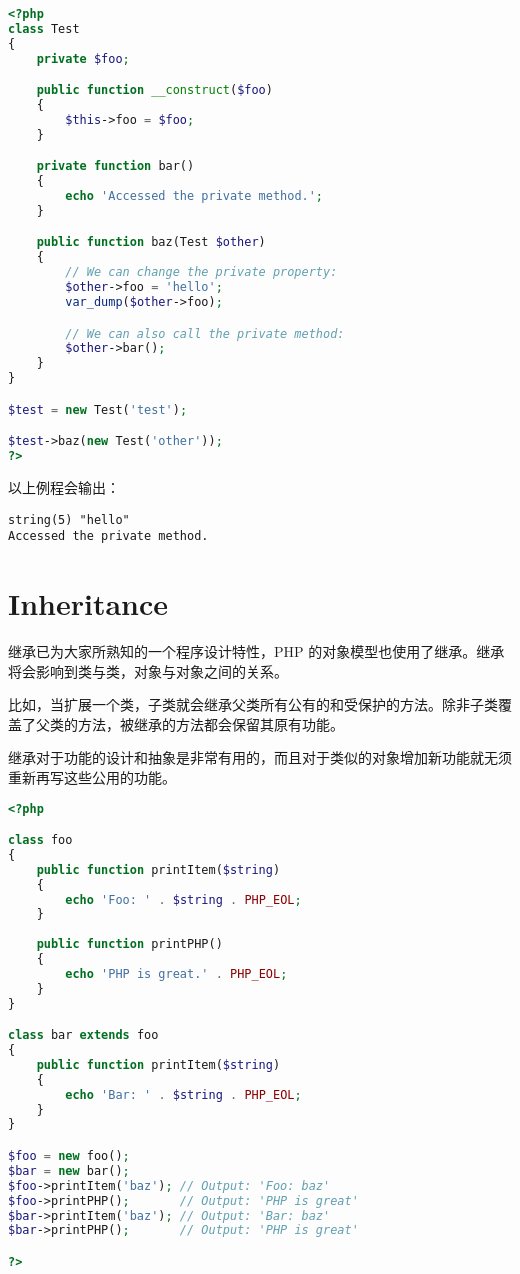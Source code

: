 \begin{lstlisting}[language=PHP]
<?php
class Test
{
    private $foo;

    public function __construct($foo)
    {
        $this->foo = $foo;
    }

    private function bar()
    {
        echo 'Accessed the private method.';
    }

    public function baz(Test $other)
    {
        // We can change the private property:
        $other->foo = 'hello';
        var_dump($other->foo);

        // We can also call the private method:
        $other->bar();
    }
}

$test = new Test('test');

$test->baz(new Test('other'));
?>
\end{lstlisting}

以上例程会输出：

\begin{verbatim}
string(5) "hello"
Accessed the private method.
\end{verbatim}


\chapter{Inheritance}

继承已为大家所熟知的一个程序设计特性，PHP 的对象模型也使用了继承。继承将会影响到类与类，对象与对象之间的关系。

比如，当扩展一个类，子类就会继承父类所有公有的和受保护的方法。除非子类覆盖了父类的方法，被继承的方法都会保留其原有功能。

继承对于功能的设计和抽象是非常有用的，而且对于类似的对象增加新功能就无须重新再写这些公用的功能。




\begin{lstlisting}[language=PHP]
<?php

class foo
{
    public function printItem($string) 
    {
        echo 'Foo: ' . $string . PHP_EOL;
    }
    
    public function printPHP()
    {
        echo 'PHP is great.' . PHP_EOL;
    }
}

class bar extends foo
{
    public function printItem($string)
    {
        echo 'Bar: ' . $string . PHP_EOL;
    }
}

$foo = new foo();
$bar = new bar();
$foo->printItem('baz'); // Output: 'Foo: baz'
$foo->printPHP();       // Output: 'PHP is great' 
$bar->printItem('baz'); // Output: 'Bar: baz'
$bar->printPHP();       // Output: 'PHP is great'

?>
\end{lstlisting}


